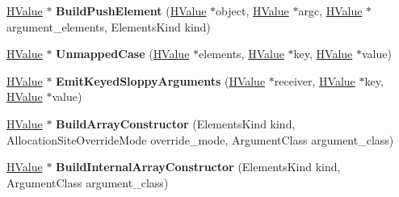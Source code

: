 \begin{DoxyCompactItemize}
\item 
\hyperlink{classv8_1_1internal_1_1_h_value}{H\+Value} $\ast$ {\bfseries Build\+Push\+Element} (\hyperlink{classv8_1_1internal_1_1_h_value}{H\+Value} $\ast$object, \hyperlink{classv8_1_1internal_1_1_h_value}{H\+Value} $\ast$argc, \hyperlink{classv8_1_1internal_1_1_h_value}{H\+Value} $\ast$argument\+\_\+elements, Elements\+Kind kind)\hypertarget{classv8_1_1internal_1_1_code_stub_graph_builder_base_af5f737c4bfbe741defc4dcb70f41309c}{}\label{classv8_1_1internal_1_1_code_stub_graph_builder_base_af5f737c4bfbe741defc4dcb70f41309c}

\item 
\hyperlink{classv8_1_1internal_1_1_h_value}{H\+Value} $\ast$ {\bfseries Unmapped\+Case} (\hyperlink{classv8_1_1internal_1_1_h_value}{H\+Value} $\ast$elements, \hyperlink{classv8_1_1internal_1_1_h_value}{H\+Value} $\ast$key, \hyperlink{classv8_1_1internal_1_1_h_value}{H\+Value} $\ast$value)\hypertarget{classv8_1_1internal_1_1_code_stub_graph_builder_base_a2469207286af1b5fd250ae7624ab5363}{}\label{classv8_1_1internal_1_1_code_stub_graph_builder_base_a2469207286af1b5fd250ae7624ab5363}

\item 
\hyperlink{classv8_1_1internal_1_1_h_value}{H\+Value} $\ast$ {\bfseries Emit\+Keyed\+Sloppy\+Arguments} (\hyperlink{classv8_1_1internal_1_1_h_value}{H\+Value} $\ast$receiver, \hyperlink{classv8_1_1internal_1_1_h_value}{H\+Value} $\ast$key, \hyperlink{classv8_1_1internal_1_1_h_value}{H\+Value} $\ast$value)\hypertarget{classv8_1_1internal_1_1_code_stub_graph_builder_base_a2101811047c643693193870c7fe24142}{}\label{classv8_1_1internal_1_1_code_stub_graph_builder_base_a2101811047c643693193870c7fe24142}

\item 
\hyperlink{classv8_1_1internal_1_1_h_value}{H\+Value} $\ast$ {\bfseries Build\+Array\+Constructor} (Elements\+Kind kind, Allocation\+Site\+Override\+Mode override\+\_\+mode, Argument\+Class argument\+\_\+class)\hypertarget{classv8_1_1internal_1_1_code_stub_graph_builder_base_a1e89846ec8bb2472f128fbb2747eb5a8}{}\label{classv8_1_1internal_1_1_code_stub_graph_builder_base_a1e89846ec8bb2472f128fbb2747eb5a8}

\item 
\hyperlink{classv8_1_1internal_1_1_h_value}{H\+Value} $\ast$ {\bfseries Build\+Internal\+Array\+Constructor} (Elements\+Kind kind, Argument\+Class argument\+\_\+class)\hypertarget{classv8_1_1internal_1_1_code_stub_graph_builder_base_ac388d641a2841562823693a3611052a5}{}\label{classv8_1_1internal_1_1_code_stub_graph_builder_base_ac388d641a2841562823693a3611052a5}


\end{DoxyCompactItemize}
